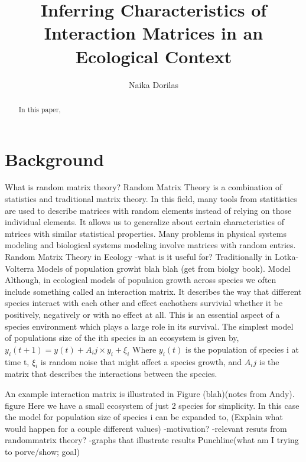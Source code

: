 \documentclass{article}
\begin{document}
\title{Inferring Characteristics of Interaction Matrices in an Ecological Context{}}
\author{Naika Dorilas}

\maketitle

\begin{abstract}
In this paper, 
\end{abstract}

\section{Background}
What is random matrix theory?\hfill\break
Random Matrix Theory is a combination of statistics and traditional matrix theory. In this field, many tools from statitistics are used to describe matrices with random elements instead of relying on those individual elements. It allows us to generalize about certain characteristics of mtrices with similar statistical properties. Many problems in physical systems modeling and biological systems modeling involve matrices with random entries. \hfill\break
Random Matrix Theory in Ecology\hfill\break
-what is it useful for?\hfill\break
Traditionally in Lotka-Volterra Models of population growht blah blah (get from biolgy book). \hfill\break
\hfill\break Model \hfill\break \hfill\break
Although, in ecological models of populaion growth across species we often include something called an interaction matrix. It describes the way that different species interact with each other and effect eachothers survivial whether it be positively, negatively or with no effect at all. This is an essential aspect of a species environment which plays a large role in its survival. The simplest model of populations size of the ith species in an ecosystem is given by,\hfill\break
\hfill\break
$y_i(t+1)=y(t) + A_ij\times y_i +\xi_i$
\hfill\break
Where $y_i(t)$ is the population of species i at time t, $\xi_i$ is random noise that might affect a species growth, and $A_ij$ is the matrix that describes the interactions between the species.

An example interaction matrix is illustrated in Figure (blah)(notes from Andy).\hfill\break 
\hfill\break figure \hfill\break \hfill\break
Here we have a small ecosystem of just 2 species for simplicity. In this case the model for population size of species i can be expanded to,
\hfill\break
\hfill\break
\hfill\break
\hfill\break
(Explain what would happen for a couple different values)\hfill\break
-motivation?\hfill\break
-relevant resuts from randommatrix theory?\hfill\break
-graphs that illustrate results\hfill\break
Punchline(what am I trying to porve/show; goal)
\end{document}
